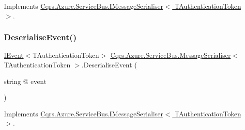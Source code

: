 Implements \hyperlink{interfaceCqrs_1_1Azure_1_1ServiceBus_1_1IMessageSerialiser_aade6efce33aae849c4c6ed1e24211ecc_aade6efce33aae849c4c6ed1e24211ecc}{Cqrs.\+Azure.\+Service\+Bus.\+I\+Message\+Serialiser$<$ T\+Authentication\+Token $>$}.

\mbox{\label{classCqrs_1_1Azure_1_1ServiceBus_1_1MessageSerialiser_a7b96e89475e9218fcb7a690fe4d02279_a7b96e89475e9218fcb7a690fe4d02279}} 
\subsubsection{\texorpdfstring{Deserialise\+Event()}{DeserialiseEvent()}}
{\footnotesize\ttfamily \hyperlink{interfaceCqrs_1_1Events_1_1IEvent}{I\+Event}$<$T\+Authentication\+Token$>$ \hyperlink{classCqrs_1_1Azure_1_1ServiceBus_1_1MessageSerialiser}{Cqrs.\+Azure.\+Service\+Bus.\+Message\+Serialiser}$<$ T\+Authentication\+Token $>$.Deserialise\+Event (\begin{DoxyParamCaption}\item[{string @}]{event }\end{DoxyParamCaption})}



Implements \hyperlink{interfaceCqrs_1_1Azure_1_1ServiceBus_1_1IMessageSerialiser_ab65c6e4a8c2a660ceb2236ee11fd33f6_ab65c6e4a8c2a660ceb2236ee11fd33f6}{Cqrs.\+Azure.\+Service\+Bus.\+I\+Message\+Serialiser$<$ T\+Authentication\+Token $>$}.

\mbox{\label{classCqrs_1_1Azure_1_1ServiceBus_1_1MessageSerialiser_aca8f19355749092a6ad7b5085dc7f057_aca8f19355749092a6ad7b5085dc7f057}} 

